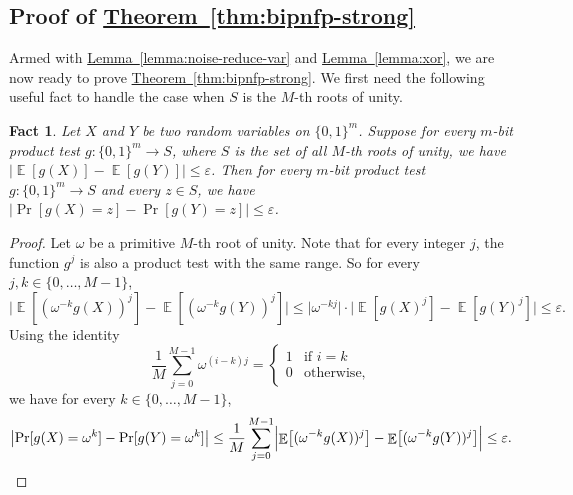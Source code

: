 \documentclass[11pt]{article}
\numberwithin{equation}{section}
\newtheorem{fact}[theorem]{Fact}
\theoremstyle{definition}
\theoremstyle{plain}
\newcommand{\expref}[2]{\hyperref[#2]{#1~\ref{#2}}}
\newcommand{\zo}{\{0,1\}}
\def\eps{\varepsilon}
\DeclareMathOperator*{\E}{\mathbb{E}}                 %
\begin{document}
  \subsection{Proof of \expref{Theorem}{thm:bipnfp-strong}}
  Armed with \expref{Lemma}{lemma:noise-reduce-var} and \expref{Lemma}{lemma:xor}, we are now ready to prove \expref{Theorem}{thm:bipnfp-strong}.
  We first need the following useful fact to handle the case when $S$ is the $M$-th roots of unity.
  \begin{fact} \label{fact:modM-to-B}
  Let $X$ and $Y$ be two random variables on $\zo^m$.
  Suppose for every
  $m$-bit  %
  product test $g\colon \zo^m \to S$, where $S$ is the set of all $M$-th roots of unity, we have
  $\bigl| \E[g(X)] - \E[g(Y)] \bigr| \le \eps$. Then for every 
  $m$-bit  %
  product test $g\colon \zo^m \to S$ and every $z \in S$, we have $\bigl| \Pr[g(X) = z] - \Pr[g(Y) = z] \bigr| \le \eps$.
  \end{fact}
  \begin{proof}
    Let $\omega$ be a primitive $M$-th root of unity.
    Note that for every integer $j$, the function $g^j$ is also a product test with the same range.
    So for every $j, k \in \{0, \ldots, M-1\}$,
    \[
      \bigl| \E[ (\omega^{-k} g(X))^j] - \E[ (\omega^{-k} g(Y))^j] \bigr|
      \le \bigl| \omega^{-kj} \bigr| \cdot \bigl| \E[ g(X)^j ] - \E[ g(Y)^j ] \bigr|
      \le \eps .
    \]
    Using the identity
    \[
      \frac{1}{M} \sum_{j=0}^{M-1} \omega^{(i-k)j} = \begin{cases} 1 & \text{if $i = k$} \\ 0 & \text{otherwise,} \end{cases}
    \]
    we have for every $k \in \{0, \ldots, M-1\}$,
    \[
      \bigl| \Pr[g(X) = \omega^k] - \Pr[g(Y) = \omega^k] \bigr|
      \le \frac{1}{M} \sum_{j=0}^{M-1} \Bigl| \E \bigl[ (\omega^{-k} g(X))^j \bigr] - \E \bigl[ (\omega^{-k} g(Y))^j \bigr] \Bigr| \\
      \le \eps . \qedhere
    \]
  \end{proof}
\end{document}
